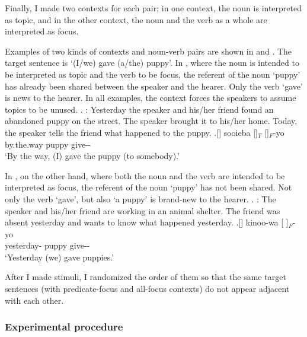Finally, I made two contexts for each pair;
in one context, the noun is interpreted as topic,
and in the other context, the noun and the verb as a whole are interpreted as focus.

Examples of two kinds of contexts and noun-verb pairs are shown in \Next and \NNext.
The target sentence is  `(I/we) gave (a/the) puppy'.
In \Next, where the noun is intended to be interpreted as topic and the verb to be focus,
the referent of the noun  `puppy' has already been shared between the speaker and the hearer.
Only the verb  `gave' is news to the hearer.
In all examples,
the context forces the speakers to assume topics to be unused.
%
\ex.\label{koinut}
: Yesterday the speaker and his/her friend found an abandoned puppy on the street. The speaker brought it to his/her home. Today, the speaker tells the friend what happened to the puppy.
\ag.[] sooieba []$_{T}$ []$_{F}$-yo \\
by.the.way puppy give-- \\
`By the way, (I) gave the puppy (to somebody).'

In \Next, on the other hand,
where both the noun and the verb are intended to be interpreted as focus,
the referent of the noun  `puppy' has not been shared.
Not only the verb `gave', but also `a puppy' is brand-new to the hearer.
%
\ex.\label{koinuf}
 : The speaker and his/her friend are working in an animal shelter. The friend was absent yesterday and wants to know what happened yesterday.
\ag.[] kinoo-wa [ ]$_{F}$-yo \\
yesterday- puppy give-- \\
`Yesterday (we) gave puppies.'



After I made stimuli,
I randomized the order of them so that
the same target sentences (with predicate-focus and all-focus contexts)
do not appear adjacent with each other.

\subsubsection{Experimental procedure}\label{Int:IUISUnitExp:Meth:Proc}

